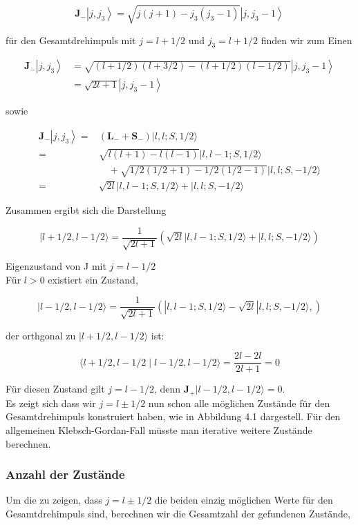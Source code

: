 \documentclass[10pt, letterpaper]{article}
\begin{document}
$$
\mathbf{J}_{-}\left|j, j_{3}\right\rangle=\sqrt{j(j+1)-j_{3}\left(j_{3}-1\right)}\left|j, j_{3}-1\right\rangle
$$

für den Gesamtdrehimpuls mit $j=l+1 / 2$ und $j_{3}=l+1 / 2$ finden wir zum Einen

$$
\begin{aligned}
\mathbf{J}_{-}\left|j, j_{3}\right\rangle & =\sqrt{(l+1 / 2)(l+3 / 2)-(l+1 / 2)(l-1 / 2)}\left|j, j_{3}-1\right\rangle \\
& =\sqrt{2 l+1}\left|j, j_{3}-1\right\rangle
\end{aligned}
$$

sowie

$$
\begin{aligned}
\mathbf{J}_{-}\left|j, j_{3}\right\rangle= & \left(\mathbf{L}_{-}+\mathbf{S}_{-}\right)|l, l ; S, 1 / 2\rangle \\
= & \sqrt{l(l+1)-l(l-1)}|l, l-1 ; S, 1 / 2\rangle \\
& \quad+\sqrt{1 / 2(1 / 2+1)-1 / 2(1 / 2-1)}|l, l ; S,-1 / 2\rangle \\
= & \sqrt{2 l}|l, l-1 ; S, 1 / 2\rangle+|l, l ; S,-1 / 2\rangle
\end{aligned}
$$

Zusammen ergibt sich die Darstellung

$$
|l+1 / 2, l-1 / 2\rangle=\frac{1}{\sqrt{2 l+1}}(\sqrt{2 l}|l, l-1 ; S, 1 / 2\rangle+|l, l ; S,-1 / 2\rangle)
$$

Eigenzustand von J mit $j=l-1 / 2$\\
Für $l>0$ existiert ein Zustand,

$$
|l-1 / 2, l-1 / 2\rangle=\frac{1}{\sqrt{2 l+1}}(|l, l-1 ; S, 1 / 2\rangle-\sqrt{2 l}|l, l ; S,-1 / 2\rangle,)
$$

der orthgonal zu $|l+1 / 2, l-1 / 2\rangle$ ist:

$$
\langle l+1 / 2, l-1 / 2 \mid l-1 / 2, l-1 / 2\rangle=\frac{2 l-2 l}{2 l+1}=0
$$

Für diesen Zustand gilt $j=l-1 / 2$, denn $\mathbf{J}_{+}|l-1 / 2, l-1 / 2\rangle=0$.\\
Es zeigt sich dass wir $j=l \pm 1 / 2$ nun schon alle möglichen Zustände für den Gesamtdrehimpuls konstruiert haben, wie in Abbildung 4.1 dargestell. Für den allgemeinen Klebsch-Gordan-Fall müsste man iterative weitere Zustände berechnen.

\subsubsection*{Anzahl der Zustände}
Um die zu zeigen, dass $j=l \pm 1 / 2$ die beiden einzig möglichen Werte für den Gesamtdrehimpuls sind, berechnen wir die Gesamtzahl der gefundenen Zustände,
\end{document}
